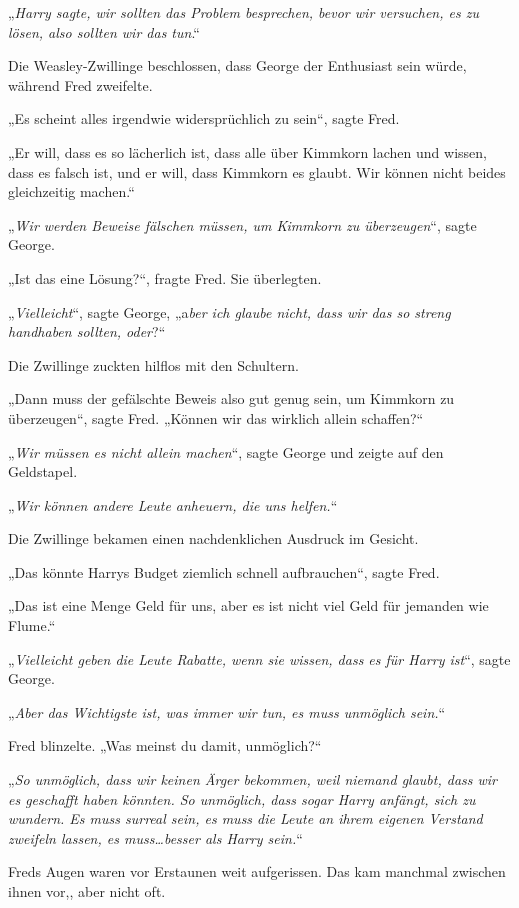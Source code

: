 {„\emph{Harry sagte, wir sollten das Problem besprechen, bevor wir versuchen, es zu lösen, also sollten wir das tun}.“

Die Weasley-Zwillinge beschlossen, dass George der Enthusiast sein würde, während Fred zweifelte.

„Es scheint alles irgendwie widersprüchlich zu sein“, sagte Fred.

„Er will, dass es so lächerlich ist, dass alle über Kimmkorn lachen und wissen, dass es falsch ist, und er will, dass Kimmkorn es glaubt. Wir können nicht beides gleichzeitig machen.“

„\emph{Wir werden Beweise fälschen müssen, um Kimmkorn zu überzeugen}“, sagte George.

„Ist das eine Lösung?“, fragte Fred. Sie überlegten.

„\emph{Vielleicht}“, sagte George, „a\emph{ber ich glaube nicht, dass wir das so streng handhaben sollten, oder}?“

Die Zwillinge zuckten hilflos mit den Schultern.

„Dann muss der gefälschte Beweis also gut genug sein, um Kimmkorn zu überzeugen“, sagte Fred. „Können wir das wirklich allein schaffen?“

„\emph{Wir müssen es nicht allein machen}“, sagte George und zeigte auf den Geldstapel.

„\emph{Wir können andere Leute anheuern, die uns helfen.}“

Die Zwillinge bekamen einen nachdenklichen Ausdruck im Gesicht.

„Das könnte Harrys Budget ziemlich schnell aufbrauchen“, sagte Fred.

„Das ist eine Menge Geld für uns, aber es ist nicht viel Geld für jemanden wie Flume.“

„\emph{Vielleicht geben die Leute Rabatte, wenn sie wissen, dass es für Harry ist}“, sagte George.

„\emph{Aber das Wichtigste ist, was immer wir tun, es muss unmöglich sein.}“

Fred blinzelte. „Was meinst du damit, unmöglich?“

„\emph{So unmöglich, dass wir keinen Ärger bekommen, weil niemand glaubt, dass wir es geschafft haben könnten. So unmöglich, dass sogar Harry anfängt, sich zu wundern. Es muss surreal sein, es muss die Leute an ihrem eigenen Verstand zweifeln lassen, es muss…besser als Harry sein.}“

Freds Augen waren vor Erstaunen weit aufgerissen. Das kam manchmal zwischen ihnen vor,, aber nicht oft.

}
